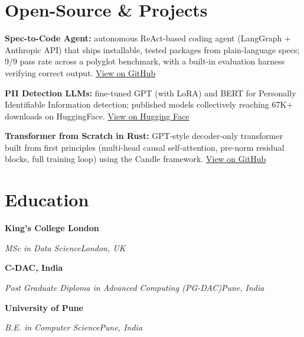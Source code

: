 \documentclass[10pt,a4paper]{article}
\newcommand{\entry}[4]{%
  {\color{company}\bfseries #1}\hfill {\color{muted}#2}\par
  \vspace{1pt}
  {\itshape #3}\hfill {\color{muted}\itshape #4}\par
  \vspace{3pt}%
}
\begin{document}
\section{Open-Source \& Projects}
\begin{tight}
  \item \textbf{Spec-to-Code Agent:} autonomous ReAct-based coding agent (LangGraph + Anthropic API) that ships installable, tested packages from plain-language specs; 9/9 pass rate across a polyglot benchmark, with a built-in evaluation harness verifying correct output. \href{https://github.com/abhijeetscode/Spec-to-Code-Agent}{View on GitHub}
  \item \textbf{PII Detection LLMs:} fine-tuned GPT (with LoRA) and BERT for Personally Identifiable Information detection; published models collectively reaching 67K+ downloads on HuggingFace. \href{https://huggingface.co/ab-ai/pii_model}{View on Hugging Face}
  \item \textbf{Transformer from Scratch in Rust:} GPT-style decoder-only transformer built from first principles (multi-head causal self-attention, pre-norm residual blocks, full training loop) using the Candle framework. \href{https://github.com/abhijeetscode/transformer-rust}{View on GitHub}
\end{tight}

\section{Education}
\entry{King's College London}{}{MSc in Data Science}{London, UK}
\vspace{-7pt}
\entry{C-DAC, India}{}{Post Graduate Diploma in Advanced Computing (PG-DAC)}{Pune, India}
\vspace{-7pt}
\entry{University of Pune}{}{B.E. in Computer Science}{Pune, India}
\end{document}
